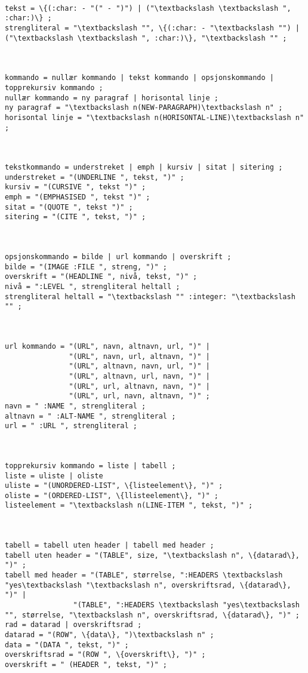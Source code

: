 \documentclass[11pt]{article}
\begin{document}
\begin{lstlisting}

tekst = \{(:char: - "(" - ")") | ("\textbackslash \textbackslash ", :char:)\} ;
strengliteral = "\textbackslash "", \{(:char: - "\textbackslash "") | ("\textbackslash \textbackslash ", :char:)\}, "\textbackslash "" ;



kommando = nullær kommando | tekst kommando | opsjonskommando | topprekursiv kommando ;
nullær kommando = ny paragraf | horisontal linje ;
ny paragraf = "\textbackslash n(NEW-PARAGRAPH)\textbackslash n" ;
horisontal linje = "\textbackslash n(HORISONTAL-LINE)\textbackslash n" ;



tekstkommando = understreket | emph | kursiv | sitat | sitering ;
understreket = "(UNDERLINE ", tekst, ")" ;
kursiv = "(CURSIVE ", tekst ")" ;
emph = "(EMPHASISED ", tekst ")" ;
sitat = "(QUOTE ", tekst ")" ;
sitering = "(CITE ", tekst, ")" ;



opsjonskommando = bilde | url kommando | overskrift ;
bilde = "(IMAGE :FILE ", streng, ")" ;
overskrift = "(HEADLINE ", nivå, tekst, ")" ;
nivå = ":LEVEL ", strengliteral heltall ;
strengliteral heltall = "\textbackslash "" :integer: "\textbackslash "" ;



url kommando = "(URL", navn, altnavn, url, ")" | 
    	       "(URL", navn, url, altnavn, ")" |
	           "(URL", altnavn, navn, url, ")" | 
	           "(URL", altnavn, url, navn, ")" |
	           "(URL", url, altnavn, navn, ")" |
	           "(URL", url, navn, altnavn, ")" ;
navn = " :NAME ", strengliteral ;
altnavn = " :ALT-NAME ", strengliteral ;
url = " :URL ", strengliteral ;



topprekursiv kommando = liste | tabell ; 
liste = uliste | oliste
uliste = "(UNORDERED-LIST", \{listeelement\}, ")" ;
oliste = "(ORDERED-LIST", \{llisteelement\}, ")" ;
listeelement = "\textbackslash n(LINE-ITEM ", tekst, ")" ;



tabell = tabell uten header | tabell med header ;
tabell uten header = "(TABLE", size, "\textbackslash n", \{datarad\}, ")" ;
tabell med header = "(TABLE", størrelse, ":HEADERS \textbackslash "yes\textbackslash "\textbackslash n", overskriftsrad, \{datarad\}, ")" |
       	   	    "(TABLE", ":HEADERS \textbackslash "yes\textbackslash "", størrelse, "\textbackslash n", overskriftsrad, \{datarad\}, ")" ;
rad = datarad | overskriftsrad ;
datarad = "(ROW", \{data\}, ")\textbackslash n" ;
data = "(DATA ", tekst, ")" ;
overskriftsrad = "(ROW ", \{overskrift\}, ")" ;
overskrift = " (HEADER ", tekst, ")" ;
\end{lstlisting}
\end{document}
